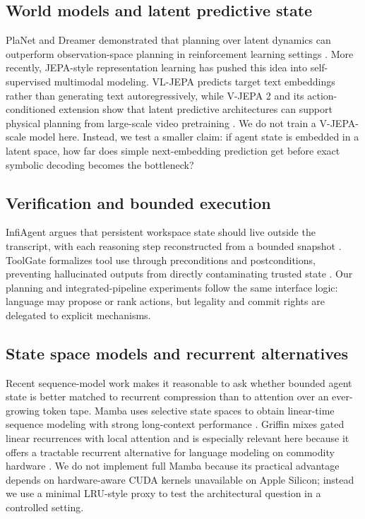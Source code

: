 \documentclass[11pt]{article}
\begin{document}
\subsection{World models and latent predictive state}
PlaNet and Dreamer demonstrated that planning over latent dynamics can outperform observation-space planning in reinforcement learning settings \citep{planet2018, dreamerv32023}. More recently, JEPA-style representation learning has pushed this idea into self-supervised multimodal modeling. VL-JEPA predicts target text embeddings rather than generating text autoregressively, while V-JEPA 2 and its action-conditioned extension show that latent predictive architectures can support physical planning from large-scale video pretraining \citep{vljepa2025, vjepa22025}. We do not train a V-JEPA-scale model here. Instead, we test a smaller claim: if agent state is embedded in a latent space, how far does simple next-embedding prediction get before exact symbolic decoding becomes the bottleneck?

\subsection{Verification and bounded execution}
InfiAgent argues that persistent workspace state should live outside the transcript, with each reasoning step reconstructed from a bounded snapshot \citep{infiagent2026}. ToolGate formalizes tool use through preconditions and postconditions, preventing hallucinated outputs from directly contaminating trusted state \citep{toolgate2026}. Our planning and integrated-pipeline experiments follow the same interface logic: language may propose or rank actions, but legality and commit rights are delegated to explicit mechanisms.

\subsection{State space models and recurrent alternatives}
Recent sequence-model work makes it reasonable to ask whether bounded agent state is better matched to recurrent compression than to attention over an ever-growing token tape. Mamba uses selective state spaces to obtain linear-time sequence modeling with strong long-context performance \citep{mamba2023}. Griffin mixes gated linear recurrences with local attention and is especially relevant here because it offers a tractable recurrent alternative for language modeling on commodity hardware \citep{griffin2024}. We do not implement full Mamba because its practical advantage depends on hardware-aware CUDA kernels unavailable on Apple Silicon; instead we use a minimal LRU-style proxy to test the architectural question in a controlled setting.
\end{document}
